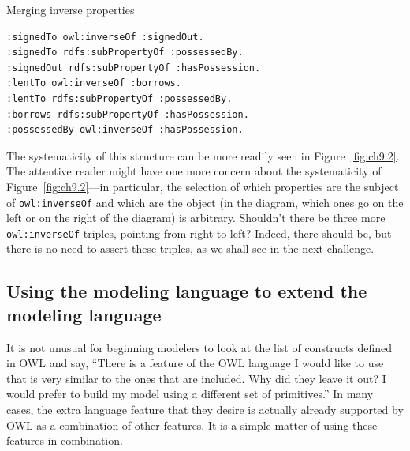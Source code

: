 \begin{challenge}{Merging inverse properties}
\begin{lstlisting}
:signedTo owl:inverseOf :signedOut.
:signedTo rdfs:subPropertyOf :possessedBy.
:signedOut rdfs:subPropertyOf :hasPossession.
:lentTo owl:inverseOf :borrows.
:lentTo rdfs:subPropertyOf :possessedBy.
:borrows rdfs:subPropertyOf :hasPossession.
:possessedBy owl:inverseOf :hasPossession.
\end{lstlisting}

The systematicity of this structure can be more readily seen in Figure~\ref{fig:ch9.2}. 
The attentive reader might have one more concern about the
systematicity of Figure~\ref{fig:ch9.2}---in particular, the selection of which
properties are the subject of \texttt{owl:inverseOf} and which are the object (in
the diagram, which ones go on the left or on the right of the diagram)
is arbitrary. Shouldn't there be three more \texttt{owl:inverseOf} triples,
pointing from right to left? Indeed, there should be, but there is no
need to assert these triples, as we shall see in the next challenge.
\end{challenge}


\subsection{Using the modeling language to extend the modeling language}

It is not unusual for beginning modelers to look at the list of
constructs defined in OWL and say, ``There is a feature of the OWL
language I would like to use that is very similar to the ones that are
included. Why did they leave it out? I would prefer to build my model
using a different set of primitives.'' In many cases, the extra language
feature that they desire is actually already supported by OWL as a
combination of other features. It is a simple matter of using these
features in combination.

